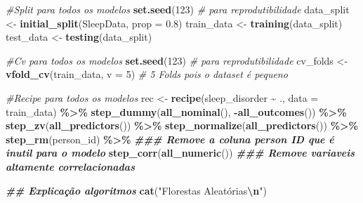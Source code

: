 \documentclass[
]{article}
\newenvironment{Shaded}{\begin{snugshade}}{\end{snugshade}}
\newcommand{\AttributeTok}[1]{\textcolor[rgb]{0.13,0.29,0.53}{#1}}
\newcommand{\CommentTok}[1]{\textcolor[rgb]{0.56,0.35,0.01}{\textit{#1}}}
\newcommand{\DecValTok}[1]{\textcolor[rgb]{0.00,0.00,0.81}{#1}}
\newcommand{\DocumentationTok}[1]{\textcolor[rgb]{0.56,0.35,0.01}{\textbf{\textit{#1}}}}
\newcommand{\FloatTok}[1]{\textcolor[rgb]{0.00,0.00,0.81}{#1}}
\newcommand{\FunctionTok}[1]{\textcolor[rgb]{0.13,0.29,0.53}{\textbf{#1}}}
\newcommand{\NormalTok}[1]{#1}
\newcommand{\OtherTok}[1]{\textcolor[rgb]{0.56,0.35,0.01}{#1}}
\newcommand{\SpecialCharTok}[1]{\textcolor[rgb]{0.81,0.36,0.00}{\textbf{#1}}}
\newcommand{\StringTok}[1]{\textcolor[rgb]{0.31,0.60,0.02}{#1}}
\begin{document}
\begin{Shaded}
\begin{Highlighting}[]
\CommentTok{\#Split para todos os modelos}
\FunctionTok{set.seed}\NormalTok{(}\DecValTok{123}\NormalTok{) }\CommentTok{\# para reprodutibilidade}
\NormalTok{data\_split }\OtherTok{\textless{}{-}} \FunctionTok{initial\_split}\NormalTok{(SleepData, }\AttributeTok{prop =} \FloatTok{0.8}\NormalTok{)}
\NormalTok{train\_data }\OtherTok{\textless{}{-}} \FunctionTok{training}\NormalTok{(data\_split)}
\NormalTok{test\_data }\OtherTok{\textless{}{-}} \FunctionTok{testing}\NormalTok{(data\_split)}

\CommentTok{\#Cv para todos os modelos}
\FunctionTok{set.seed}\NormalTok{(}\DecValTok{123}\NormalTok{) }\CommentTok{\# para reprodutibilidade}
\NormalTok{cv\_folds }\OtherTok{\textless{}{-}} \FunctionTok{vfold\_cv}\NormalTok{(train\_data, }\AttributeTok{v =} \DecValTok{5}\NormalTok{) }\CommentTok{\# 5 Folds pois o dataset é pequeno}

\CommentTok{\#Recipe para todos os modelos}
\NormalTok{rec }\OtherTok{\textless{}{-}} \FunctionTok{recipe}\NormalTok{(sleep\_disorder }\SpecialCharTok{\textasciitilde{}}\NormalTok{ ., }\AttributeTok{data =}\NormalTok{ train\_data) }\SpecialCharTok{\%\textgreater{}\%}
  \FunctionTok{step\_dummy}\NormalTok{(}\FunctionTok{all\_nominal}\NormalTok{(), }\SpecialCharTok{{-}}\FunctionTok{all\_outcomes}\NormalTok{()) }\SpecialCharTok{\%\textgreater{}\%}
  \FunctionTok{step\_zv}\NormalTok{(}\FunctionTok{all\_predictors}\NormalTok{()) }\SpecialCharTok{\%\textgreater{}\%}
  \FunctionTok{step\_normalize}\NormalTok{(}\FunctionTok{all\_predictors}\NormalTok{()) }\SpecialCharTok{\%\textgreater{}\%} 
  \FunctionTok{step\_rm}\NormalTok{(person\_id) }\SpecialCharTok{\%\textgreater{}\%}  \DocumentationTok{\#\#\# Remove a coluna person ID que é inutil para o modelo}
  \FunctionTok{step\_corr}\NormalTok{(}\FunctionTok{all\_numeric}\NormalTok{()) }\DocumentationTok{\#\#\# Remove variaveis altamente correlacionadas}
\end{Highlighting}
\end{Shaded}

\begin{Shaded}
\begin{Highlighting}[]
\DocumentationTok{\#\# Explicação algoritmos}
\FunctionTok{cat}\NormalTok{(}\StringTok{"Florestas Aleatórias}\SpecialCharTok{\textbackslash{}n}\StringTok{"}\NormalTok{)}
\end{Highlighting}
\end{Shaded}
\end{document}
